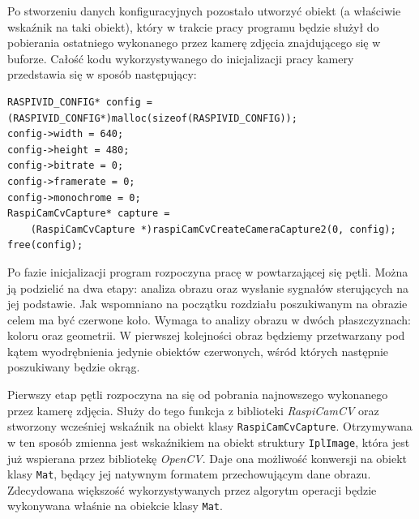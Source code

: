 Po stworzeniu danych konfiguracyjnych pozostało utworzyć obiekt (a właściwie wskaźnik na taki obiekt), który w trakcie pracy programu będzie służył do pobierania ostatniego wykonanego przez kamerę zdjęcia znajdującego się w buforze. Całość kodu wykorzystywanego do inicjalizacji pracy kamery przedstawia się w sposób następujący:
\begin{lstlisting}[caption=Inicjalizacja pracy kamery]
RASPIVID_CONFIG* config = (RASPIVID_CONFIG*)malloc(sizeof(RASPIVID_CONFIG));
config->width = 640;
config->height = 480;
config->bitrate = 0;
config->framerate = 0;
config->monochrome = 0;
RaspiCamCvCapture* capture =
	(RaspiCamCvCapture *)raspiCamCvCreateCameraCapture2(0, config);
free(config); 
\end{lstlisting}

Po fazie inicjalizacji program rozpoczyna pracę w powtarzającej się pętli. Można ją podzielić na dwa etapy: analiza obrazu oraz wysłanie sygnałów sterujących na jej podstawie. Jak wspomniano na początku rozdziału poszukiwanym na obrazie celem ma być czerwone koło. Wymaga to analizy obrazu w dwóch płaszczyznach: koloru oraz geometrii. W pierwszej kolejności obraz będziemy przetwarzany pod kątem wyodrębnienia jedynie obiektów czerwonych, wśród których następnie poszukiwany będzie okrąg.

Pierwszy etap pętli rozpoczyna na się od pobrania najnowszego wykonanego przez kamerę zdjęcia. Służy do tego funkcja z biblioteki \textit{RaspiCamCV} oraz stworzony wcześniej wskaźnik na obiekt klasy \texttt{RaspiCamCvCapture}. Otrzymywana w ten sposób zmienna jest wskaźnikiem na obiekt struktury \texttt{IplImage}, która jest już wspierana przez bibliotekę \textit{OpenCV}. Daje ona możliwość konwersji na obiekt klasy \texttt{Mat}, będący jej natywnym formatem przechowującym dane obrazu. Zdecydowana większość wykorzystywanych przez algorytm operacji będzie wykonywana właśnie na obiekcie klasy \texttt{Mat}.

